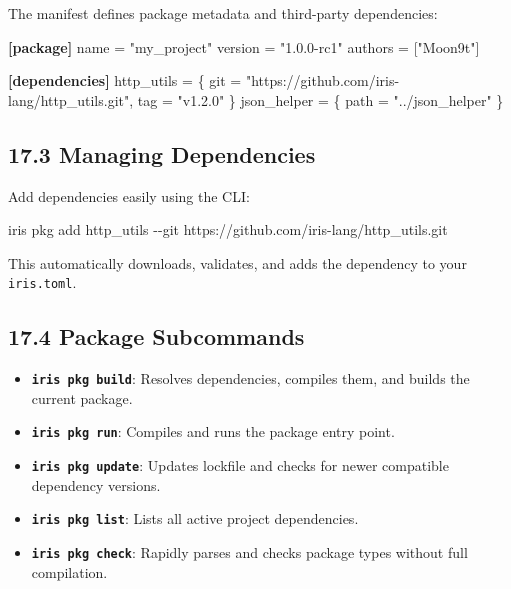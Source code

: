 \documentclass[
  english,
]{book}
\newenvironment{Shaded}{\begin{snugshade}}{\end{snugshade}}
\newcommand{\AttributeTok}[1]{\textcolor[rgb]{0.83,0.83,0.83}{#1}}
\newcommand{\DataTypeTok}[1]{\textcolor[rgb]{0.31,0.79,0.69}{#1}}
\newcommand{\ExtensionTok}[1]{\textcolor[rgb]{0.83,0.83,0.83}{#1}}
\newcommand{\KeywordTok}[1]{\textcolor[rgb]{0.34,0.61,0.84}{\textbf{#1}}}
\newcommand{\NormalTok}[1]{\textcolor[rgb]{0.83,0.83,0.83}{#1}}
\newcommand{\OperatorTok}[1]{\textcolor[rgb]{0.83,0.83,0.83}{#1}}
\newcommand{\StringTok}[1]{\textcolor[rgb]{0.81,0.57,0.47}{#1}}
\providecommand{\tightlist}{%
  \setlength{\itemsep}{0pt}\setlength{\parskip}{0pt}}
\begin{document}
The manifest defines package metadata and third-party dependencies:

\begin{Shaded}
\begin{Highlighting}[]
\KeywordTok{[package]}
\DataTypeTok{name} \OperatorTok{=} \StringTok{"my\_project"}
\DataTypeTok{version} \OperatorTok{=} \StringTok{"1.0.0{-}rc1"}
\DataTypeTok{authors} \OperatorTok{=} \OperatorTok{[}\StringTok{"Moon9t"}\OperatorTok{]}

\KeywordTok{[dependencies]}
\DataTypeTok{http\_utils} \OperatorTok{=} \OperatorTok{\{ }\DataTypeTok{git}\OperatorTok{ =} \StringTok{"https://github.com/iris{-}lang/http\_utils.git"}\OperatorTok{, }\DataTypeTok{tag}\OperatorTok{ =} \StringTok{"v1.2.0"}\OperatorTok{ \}}
\DataTypeTok{json\_helper} \OperatorTok{=} \OperatorTok{\{ }\DataTypeTok{path}\OperatorTok{ =} \StringTok{"../json\_helper"}\OperatorTok{ \}}
\end{Highlighting}
\end{Shaded}

\subsection{17.3 Managing Dependencies}\label{managing-dependencies}

Add dependencies easily using the CLI:

\begin{Shaded}
\begin{Highlighting}[]
\ExtensionTok{iris}\NormalTok{ pkg add http\_utils }\AttributeTok{{-}{-}git}\NormalTok{ https://github.com/iris{-}lang/http\_utils.git}
\end{Highlighting}
\end{Shaded}

This automatically downloads, validates, and adds the dependency to your
\texttt{iris.toml}.

\subsection{17.4 Package Subcommands}\label{package-subcommands}

\begin{itemize}
\tightlist
\item
  \textbf{\texttt{iris\ pkg\ build}}: Resolves dependencies, compiles
  them, and builds the current package.
\item
  \textbf{\texttt{iris\ pkg\ run}}: Compiles and runs the package entry
  point.
\item
  \textbf{\texttt{iris\ pkg\ update}}: Updates lockfile and checks for
  newer compatible dependency versions.
\item
  \textbf{\texttt{iris\ pkg\ list}}: Lists all active project
  dependencies.
\item
  \textbf{\texttt{iris\ pkg\ check}}: Rapidly parses and checks package
  types without full compilation.
\end{itemize}
\end{document}

